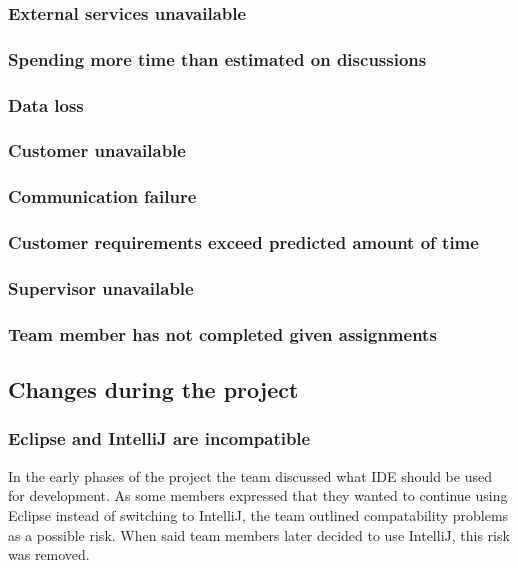 \subsubsection{External services unavailable}
\subsubsection{Spending more time than estimated on discussions}
\subsubsection{Data loss}
\subsubsection{Customer unavailable}
\subsubsection{Communication failure}
\subsubsection{Customer requirements exceed predicted amount of time}
\subsubsection{Supervisor unavailable}
\subsubsection{Team member has not completed given assignments}


\subsection{Changes during the project}
\subsubsection{Eclipse and IntelliJ are incompatible}
In the early phases of the project the team discussed what IDE should be used for development. As some members expressed that they wanted to continue using Eclipse instead of switching to IntelliJ, the team outlined compatability problems as a possible risk. When said team members later decided to use IntelliJ, this risk was removed.
